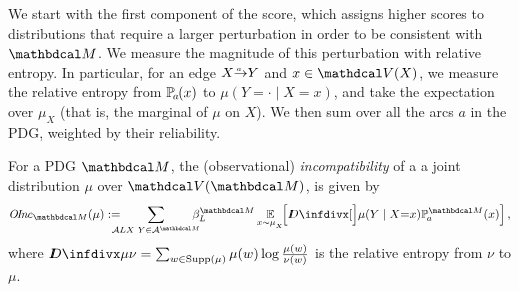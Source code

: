 We start with the first component of the score, which assigns higher scores to
distributions that require a larger perturbation in order to be consistent with
$\dg M$.  
We measure the magnitude of this perturbation with relative entropy. In
particular, for an edge $\ed aXY$ and $x \in \V(X)$, we measure
the relative entropy from $\p_a(x)$ to $\mu(Y \!= \cdot\mid X=x)$, and take the
expectation over $\mu_X$ (that is, the marginal of $\mu$ on $X$). We then sum
over all the arcs $a$ in the PDG, weighted by their reliability.


\begin{defn}\label{def:inc}
    For a PDG $\dg M$, the (observational) \emph{incompatibility} of a
    a joint distribution $\mu$ over $\V(\dg M)$, is given by
    \[
	\OInc_{\dg M }( \mu) := 
		\!\!\!\!\!\!\sum_{\Ar L{X\,}{\,Y} \in \Ar^{\dg M}} \!\!\!\!\!\beta_L^{\dg M} \Ex_{x \sim \mu_{_X}}\!\!
\left[\kldiv[\Big]{ \mu(Y \mid X {=} x) }{\p_a^{\dg M}(x) } \right] , \]
	where $\kldiv{\mu}{\nu} = \sum_{w \in \text{Supp($\mu$)}} \mu(w) \log\frac{\mu(w)}{\nu(w)}$ is the 
	relative entropy from $\nu$ to $\mu$.
\end{defn}

